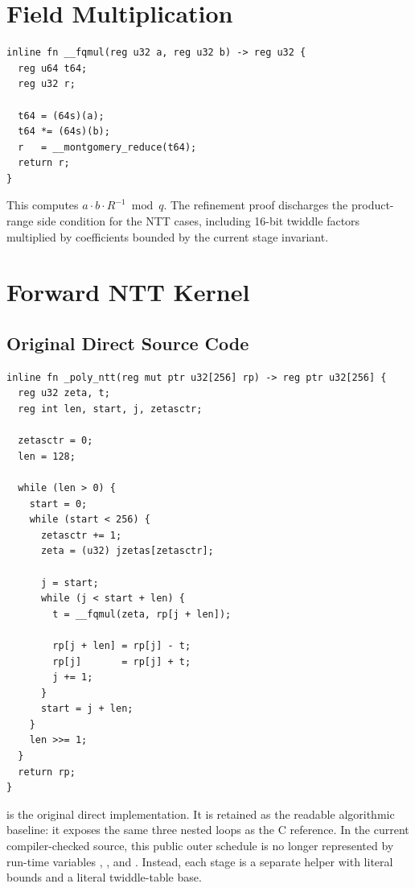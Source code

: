 \section{Field Multiplication}

\begin{lstlisting}[language=Jasmin,
  caption={Field multiplication in \texttt{reduce.jinc}},
  label={lst:fqmul_jasmin}]
inline fn __fqmul(reg u32 a, reg u32 b) -> reg u32 {
  reg u64 t64;
  reg u32 r;

  t64 = (64s)(a);
  t64 *= (64s)(b);
  r   = __montgomery_reduce(t64);
  return r;
}
\end{lstlisting}

This computes $a \cdot b \cdot R^{-1} \bmod q$.  The refinement proof
discharges the product-range side condition for the NTT cases, including
16-bit twiddle factors multiplied by coefficients bounded by the current
stage invariant.

\section{Forward NTT Kernel}

\subsection{Original Direct Source Code}

\begin{lstlisting}[language=Jasmin,
  caption={Original direct forward NTT kernel in \texttt{poly.jinc}},
  label={lst:ntt_jasmin}]
inline fn _poly_ntt(reg mut ptr u32[256] rp) -> reg ptr u32[256] {
  reg u32 zeta, t;
  reg int len, start, j, zetasctr;

  zetasctr = 0;
  len = 128;

  while (len > 0) {
    start = 0;
    while (start < 256) {
      zetasctr += 1;
      zeta = (u32) jzetas[zetasctr];

      j = start;
      while (j < start + len) {
        t = __fqmul(zeta, rp[j + len]);

        rp[j + len] = rp[j] - t;
        rp[j]       = rp[j] + t;
        j += 1;
      }
      start = j + len;
    }
    len >>= 1;
  }
  return rp;
}
\end{lstlisting}

 is the original direct implementation.  It is retained
as the readable algorithmic baseline: it exposes the same three nested loops as
the C reference.  In the current compiler-checked source, this public outer
schedule is no longer represented by run-time variables ,
, and .  Instead, each stage is a separate helper
with literal bounds and a literal twiddle-table base.

